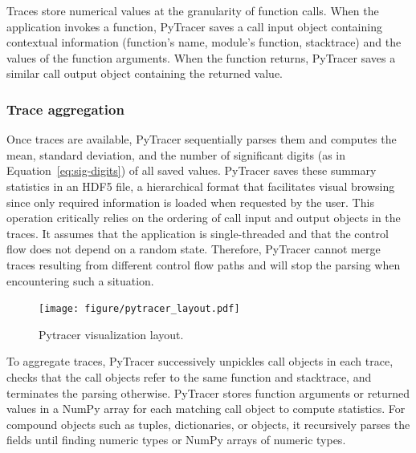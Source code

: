 \documentclass[10pt,journal,compsoc]{IEEEtran}
\newcommand{\pytracer}[0]{PyTracer\xspace}
\begin{document}
Traces store numerical values at the granularity of function calls. When the
application invokes a function, \pytracer saves a call input object containing
contextual information (function's name, module's function, stacktrace) and the
values of the function arguments. When the function returns, \pytracer saves a
similar call output object containing the returned value. 


\subsubsection{Trace aggregation}

Once traces are available, \pytracer sequentially parses them and computes the
mean, standard deviation, and the number of significant digits (as in
Equation~\ref{eq:sig-digits}) of all saved values. \pytracer saves these summary
statistics in an HDF5 file, a hierarchical format that facilitates visual
browsing since only required information is loaded when requested by the user.
This operation critically relies on the ordering of call input and output
objects in the traces. It assumes that the application is
single-threaded and that the control flow does not depend on a random state.
Therefore, \mbox{\pytracer} cannot merge traces resulting from different
control flow paths and will stop the parsing when encountering such a situation.

\begin{figure}
    \centering
    \texttt{[image: figure/pytracer\_layout.pdf]}
    \caption{Pytracer visualization layout.}
    \label{fig:visu-layout}
\end{figure}


To aggregate traces, \pytracer successively unpickles call objects in each
trace, checks that the call objects refer to the same function and stacktrace,
and terminates the parsing otherwise. PyTracer stores function arguments or
returned values in a NumPy array for each matching call object to compute
statistics. For compound objects such as tuples, dictionaries, or objects, it
recursively parses the fields until finding numeric types or NumPy arrays of
numeric types.
\end{document}
